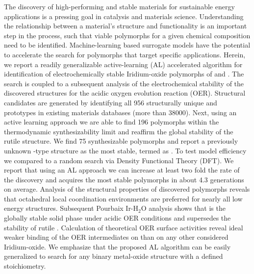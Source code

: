 %


%
\noindent The discovery of high-performing and stable materials for sustainable energy applications is a pressing goal in catalysis and materials science.
%
Understanding the relationship between a material's structure and functionality is an important step in the process, such that viable polymorphs for a given chemical composition need to be identified.
%
Machine-learning based surrogate models have the potential to accelerate the search for polymorphs that target specific applications.
%
Herein, we report a readily generalizable active-learning (AL) accelerated algorithm for identification of electrochemically stable Iridium-oxide polymorphs of \IrOtwo and \IrOthree.
%
The search is coupled to a subsequent analysis of the electrochemical stability of the discovered structures for the acidic oxygen evolution reaction (OER).
%
Structural candidates are generated by identifying all \num{956} structurally unique \ABtwo and \ABthree prototypes in existing materials databases (more than \num{38000}).
%
Next, using an active learning approach we are able to find \num{196} \IrOtwo polymorphs within the thermodynamic synthesizability limit and reaffirm the global stability of the rutile structure.
%
We find \num{75} synthesizable \IrOthree polymorphs and report a previously unknown -type structure as the most stable, termed as \aIrOthree.
%
To test model efficiency we compared to a random search via Density Functional Theory (DFT).
%
We report that using an AL approach we can increase at least two fold the rate of the discovery and acquires the most stable polymorphs in about \num{4.3} generations on average.
%
Analysis of the structural properties of discovered polymorphs reveals that octahedral local coordination environments are preferred for nearly all low energy structures.
%
Subsequent Pourbaix Ir-H$_2$O analysis shows that \aIrOthree is the globally stable solid phase under acidic OER conditions and supersedes the stability of rutile \IrOtwo.
%
Calculation of theoretical OER surface activities reveal ideal weaker binding of the OER intermediates on \aIrOthree than on any other considered Iridium-oxide.
%
We emphasize that the proposed AL algorithm can be easily generalized to search for any binary metal-oxide structure with a defined stoichiometry.

